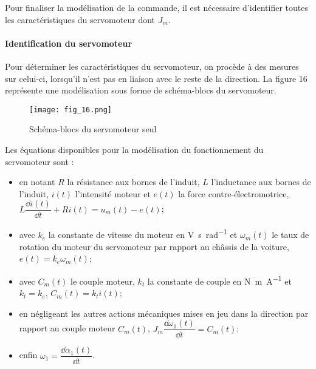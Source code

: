 


Pour finaliser la modélisation de la commande, il est nécessaire d’identifier toutes les caractéristiques du servomoteur dont $J_m$.

\paragraph{Identification du servomoteur}

Pour déterminer les caractéristiques du servomoteur, on procède à des mesures sur celui-ci, lorsqu’il n’est pas
en liaison avec le reste de la direction. La figure 16 représente une modélisation sous forme de schéma-blocs du
servomoteur.


\begin{figure}[H]
\centering
\texttt{[image: fig\_16.png]}
\caption{Schéma-blocs du servomoteur seul \label{fig_16}}
\end{figure}

Les équations disponibles pour la modélisation du fonctionnement du servomoteur sont :
\begin{itemize}
\item en notant $R$ la résistance aux bornes de l’induit, $L$ l’inductance aux bornes de l’induit, $i(t)$ l’intensité moteur et $e(t)$ la force contre-électromotrice, $L\dfrac{\dd i(t)}{\dd t} +Ri(t) =u_m(t)-e(t)$;
\item avec $k_e$ la constante de vitesse du moteur en \si{V.s.rad^{-1}} et $\omega_m(t)$ le taux de rotation du moteur du servomoteur par rapport au châssis de la voiture, $e(t)=k_e\omega_m(t)$;
\item avec $C_m(t)$ le couple moteur, $k_t$ la constante de couple en \si{N.m.A^{-1}} et $k_t=k_e$, 
$C_m(t)=k_t i(t)$;
\item en négligeant les autres actions mécaniques mises en jeu dans la direction par rapport au couple moteur
$C_m(t)$, $J_m\dfrac{\dd \omega_1(t)}{\dd t} = C_m(t)$;
\item enfin $\omega_1=\dfrac{\dd \alpha_1(t)}{\dd t}$.
\end{itemize}

